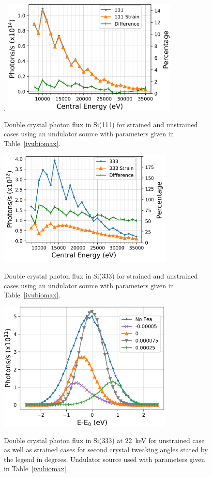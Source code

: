 \documentclass{iucr}
\begin{document}
\begin{figure}
\caption{Double crystal photon flux in Si(111) for strained and unstrained cases using an undulator source with parameters given in Table~\ref{ivubiomax}.}.
\includegraphics[width = 8.85cm]{images/ivu111flux.png}
\label{fig:ivu111flux}
\end{figure}

\begin{figure}
\caption{Double crystal photon flux in Si(333) for strained and unstrained cases using an undulator source with parameters given in Table~\ref{ivubiomax}.}
\includegraphics[width = 8.85cm]{images/ivu333flux.png}
\label{fig:ivu333flux}
\end{figure}

\begin{figure}
\caption{Double crystal photon flux in Si(333) at 22~keV for unstrained case as well as strained cases for second crystal tweaking angles stated by the legend in degrees. Undulator source used with parameters given in Table~\ref{ivubiomax}.}
\includegraphics[width = 8.85cm]{images/26kevangle.png}
\label{fig:26kevangle}
\end{figure}
\end{document}
